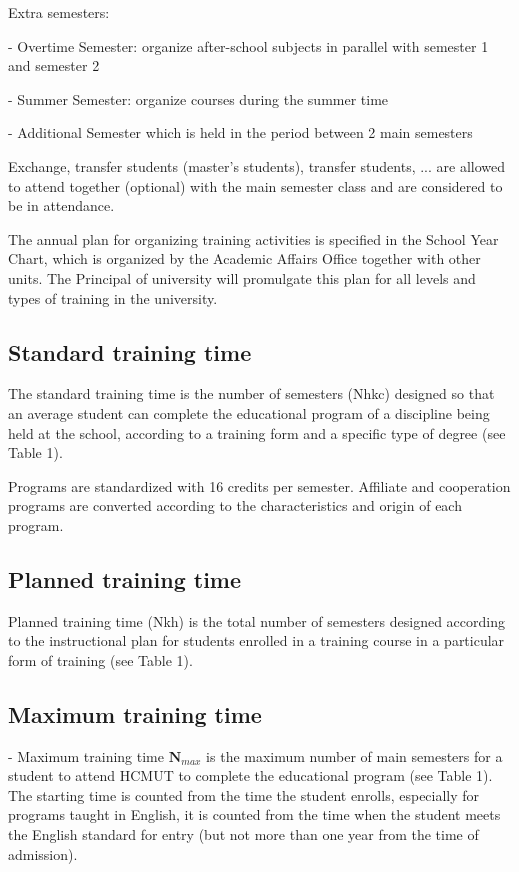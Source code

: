 Extra semesters:

- Overtime Semester: organize after-school subjects in parallel with semester 1 and semester 2

- Summer Semester: organize courses during the summer time

- Additional Semester which is held in the period between 2 main semesters

Exchange, transfer students (master's students), transfer students, ... are allowed to attend together (optional) with the main semester class and are considered to be in attendance.

The annual plan for organizing training activities is specified in the School Year Chart, which is organized by the Academic Affairs Office together with other units. The Principal of university will promulgate this plan for all levels and types of training in the university.

\subsection{Standard training time}
The standard training time is the number of semesters (Nhkc) designed so that an average student can complete the educational program of a discipline being held at the school, according to a training form and a specific type of degree (see Table 1).

Programs are standardized with 16 credits per semester. Affiliate and cooperation programs are converted according to the characteristics and origin of each program.

\subsection{Planned training time}
Planned training time (Nkh) is the total number of semesters designed according to the instructional plan for students enrolled in a training course in a particular form of training (see Table 1).

\subsection{Maximum training time}
- Maximum training time $ \textbf{N}_{max} $ is the maximum number of main semesters for a student to attend HCMUT to complete the educational program (see Table 1). The starting time is counted from the time the student enrolls, especially for programs taught in English, it is counted from the time when the student meets the English standard for entry (but not more than one year from the time of admission).